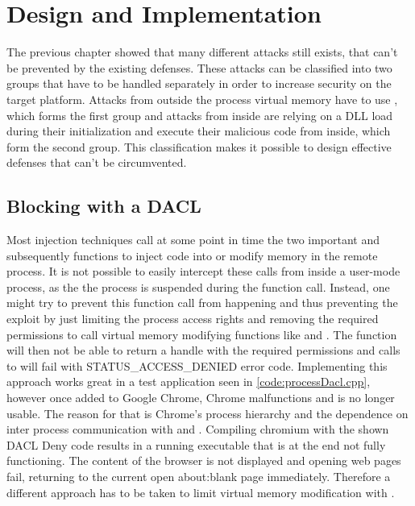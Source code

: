 \section{Design and Implementation}
\label{chap_implementation}
The previous chapter showed that many different attacks still exists, that can't be prevented by the existing defenses. These attacks can be classified into two groups that have to be handled separately in order to increase security on the target platform. Attacks from outside the process virtual memory have to use , which forms the first group and attacks from inside are relying on a DLL load during their initialization and execute their malicious code from inside, which form the second group. This classification makes it possible to design effective defenses that can't be circumvented. 

\subsection{Blocking  with a DACL}
\label{sec:implementation_dacl}
Most injection techniques call at some point in time the two important  and subsequently  functions to inject code into or modify memory in the remote process. It is not possible to easily intercept these calls from inside a user-mode process, as the the process is suspended during the  function call. Instead, one might try to prevent this function call from happening and thus preventing the exploit by just limiting the process access rights and removing the required permissions to call virtual memory modifying functions like  and . The  function will then not be able to return a handle with the required permissions and calls to  will fail with STATUS\_ACCESS\_DENIED error code. Implementing this approach works great in a test application seen in \ref{code:processDacl.cpp}, however once added to Google Chrome, Chrome malfunctions and is no longer usable. The reason for that is Chrome's process hierarchy and the dependence on inter process communication with  and . Compiling chromium with the shown DACL Deny code results in a running executable that is at the end not fully functioning. The content of the browser is not displayed and opening web pages fail, returning to the current open about:blank page immediately. Therefore a different approach has to be taken to limit virtual memory modification with .

